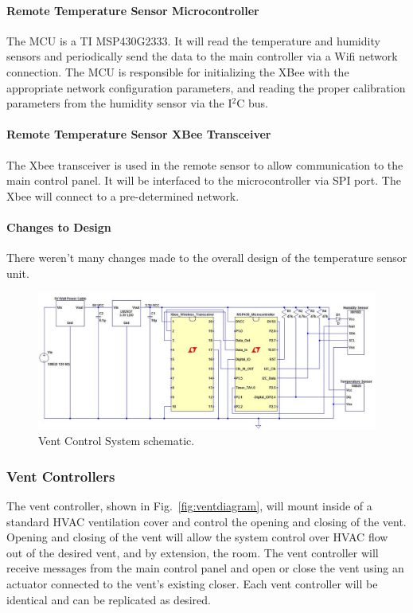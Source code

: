 \paragraph{Remote Temperature Sensor Microcontroller}
The MCU is a TI MSP430G2333.  It will read the temperature and humidity sensors and periodically send the data to the main controller via a Wifi network connection.  The MCU is responsible for initializing the XBee with the appropriate network configuration parameters, and reading the proper calibration parameters from the humidity sensor via the I$^2$C bus.
\paragraph{Remote Temperature Sensor XBee Transceiver}
The Xbee transceiver is used in the remote sensor to allow communication to the main control panel. It will be interfaced to the microcontroller via SPI port.  The Xbee will connect to a pre-determined network.
\paragraph{Changes to Design}
There weren't many changes made to the overall design of the temperature sensor unit. 

\begin{figure}[htbp]
\centering
\includegraphics[width=.99\textwidth]{Vent_System.JPG}
\caption{Vent Control System schematic.}
\label{fig:Vent_System}
\end{figure}

\subsubsection{Vent Controllers}
The vent controller, shown in Fig.~\ref{fig:ventdiagram}, will mount inside of a standard HVAC ventilation cover and control the opening and closing of the vent.  Opening and closing of the vent will allow the system control over HVAC flow out of the desired vent, and by extension, the room. The vent controller will receive messages from the main control panel and open or close the vent using an actuator connected to the vent's existing closer. Each vent controller will be identical and can be replicated as desired.

